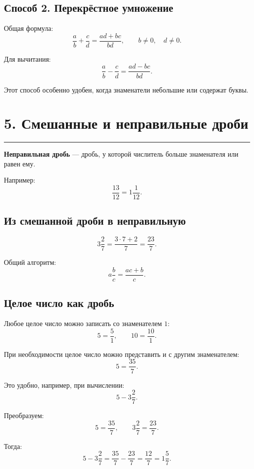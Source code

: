 \documentclass[a4paper,12pt]{article}
\newcommand{\sectionline}{%
    \vspace{-0.25em}
    {\color{accent}\rule{\linewidth}{0.7pt}}
    \vspace{0.3em}
}
\begin{document}
\subsection*{\color{accent}Способ 2. Перекрёстное умножение}

Общая формула:
\[
\frac ab+\frac cd
=
\frac{ad+bc}{bd},
\qquad b\ne0,\quad d\ne0.
\]

Для вычитания:
\[
\frac ab-\frac cd
=
\frac{ad-bc}{bd}.
\]

Этот способ особенно удобен, когда знаменатели небольшие или содержат буквы.


\section*{\color{darkaccent}5. Смешанные и неправильные дроби}
\sectionline

\textbf{Неправильная дробь} --- дробь, у которой числитель больше знаменателя
или равен ему.

Например:
\[
\frac{13}{12}=1\frac1{12}.
\]

\subsection*{\color{accent}Из смешанной дроби в неправильную}

\[
3\frac27
=
\frac{3\cdot7+2}{7}
=
\frac{23}{7}.
\]

Общий алгоритм:
\[
a\frac bc
=
\frac{ac+b}{c}.
\]

\subsection*{\color{accent}Целое число как дробь}

Любое целое число можно записать со знаменателем \(1\):
\[
5=\frac51,
\qquad
10=\frac{10}{1}.
\]

При необходимости целое число можно представить и с другим знаменателем:
\[
5=\frac{35}{7}.
\]

Это удобно, например, при вычислении:
\[
5-3\frac27.
\]

Преобразуем:
\[
5=\frac{35}{7},
\qquad
3\frac27=\frac{23}{7}.
\]

Тогда:
\[
5-3\frac27
=
\frac{35}{7}-\frac{23}{7}
=
\frac{12}{7}
=
1\frac57.
\]

\end{document}
